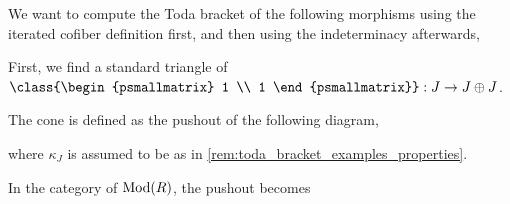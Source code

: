 \begin{example}
	We want to compute the Toda bracket of the following morphisms using the iterated cofiber definition first, and then using the indeterminacy afterwards,
	\begin{center}
	\end{center}

	First, we find a standard triangle of \( \class{\begin{psmallmatrix} 1 \\ 1 \end{psmallmatrix}}: J \to J \oplus J \).

	The cone is defined as the pushout of the following diagram,
	\begin{center}
	\end{center}
	where \( \kappa_J \) is assumed to be as in \autoref{rem:toda_bracket_examples_properties}.

	In the category of \( \operatorname{Mod}(R) \), the pushout becomes
	\begin{center}
\end{center}
\end{example}
